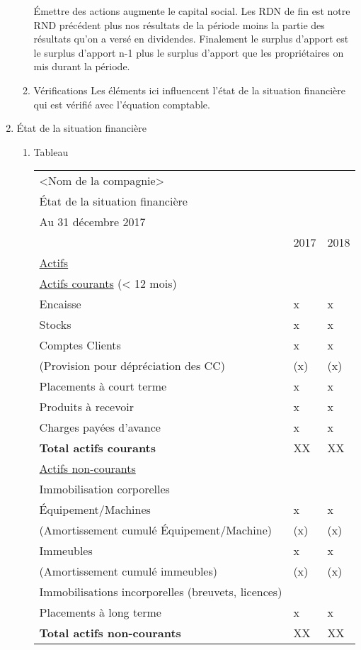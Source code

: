 \documentclass[11pt]{article}
\begin{document}
\begin{enumerate}
\begin{enumerate}
Émettre des actions augmente le capital social.  Les RDN de fin est notre RND
précédent plus nos résultats de la période moins la partie des résultats qu'on a
versé en dividendes.  Finalement le surplus d'apport est le surplus d'apport n-1
plus le surplus d'apport que les propriétaires on mis durant la période.
\item Vérifications
\label{sec:org9b4c62c}
Les éléments ici influencent l'état de la situation financière qui est vérifié
avec l'équation comptable.
\end{enumerate}
\item État de la situation financière
\label{sec:org534d1be}
\begin{enumerate}
\item Tableau
\label{sec:org9939bbd}
\begin{center}
\begin{tabular}{lll}
\hline
<Nom de la compagnie> &  & \\
État de la situation financière &  & \\
Au 31 décembre 2017 &  & \\
\hline
 & 2017 & 2018\\
\hline
\uline{Actifs} &  & \\
\hline
\uline{Actifs courants} (< 12 mois) &  & \\
Encaisse & x & x\\
Stocks & x & x\\
Comptes Clients & x & x\\
(Provision pour dépréciation des CC) & (x) & (x)\\
Placements à court terme & x & x\\
Produits à recevoir & x & x\\
Charges payées d'avance & x & x\\
\textbf{Total actifs courants} & XX & XX\\
\hline
\uline{Actifs non-courants} &  & \\
Immobilisation corporelles &  & \\
Équipement/Machines & x & x\\
(Amortissement cumulé Équipement/Machine) & (x) & (x)\\
Immeubles & x & x\\
(Amortissement cumulé immeubles) & (x) & (x)\\
Immobilisations incorporelles (breuvets, licences) &  & \\
Placements à long terme & x & x\\
\textbf{Total actifs non-courants} & XX & XX\\

\end{tabular}
\end{center}
\end{enumerate}
\end{enumerate}
\end{document}
